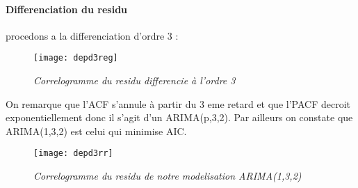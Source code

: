             \paragraph{Differenciation du residu} procedons a la differenciation
            d'ordre 3 :
            \begin{figure}[H]
                \centering 
                \label{fig:depd3reg} 
                \texttt{[image: depd3reg]} 
                \caption{\it Correlogramme du residu differencie à l'ordre 3 } 
            \end{figure} 
            On remarque que l'ACF s'annule à partir du 3 eme retard et que
            l'PACF decroit exponentiellement donc il s'agit d'un ARIMA(p,3,2).
            Par ailleurs on constate que ARIMA(1,3,2) est celui qui minimise
            AIC.
            
            \begin{figure}[H]
                \centering 
                \label{fig:depd3rr} 
                \texttt{[image: depd3rr]} 
                \caption{\it Correlogramme du residu de notre modelisation ARIMA(1,3,2) } 
            \end{figure} 

